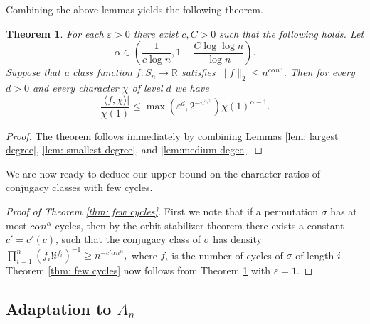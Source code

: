 \documentclass[11pt, letterpaper]{amsart}
\newtheorem{thm}{Theorem}[section]
\newcommand{\remove}[1]{}
\newcommand\eps{\varepsilon}
\renewcommand\ge{\geqslant}
\renewcommand\le{\leqslant}
\renewcommand{\epsilon}{\eps}
\begin{document}
Combining the above lemmas yields the following theorem. 
\begin{thm}\label{thm: Useful for mixing times}
For each $\epsilon>0$ there exist  $c,C>0$ such that the following holds. Let \[\alpha \in\left(\frac{1}{c\log n}, 1-\frac{C\log \log n}{\log n}\right).\] Suppose that a class function $f\colon S_n\to \mathbb{R}$ satisfies $\|f\|_2 \le  n^{c\alpha n^\alpha}.$ Then for every $d>0$ and every character $\chi$ of level $d$ we have 
\[\frac{\left|\langle f,\chi\rangle \right|}{\chi(1)} \le \max\left(\epsilon^d, 2^{-n^{3/5}}\right) \chi(1)^{\alpha -1}.\] 
\end{thm}
\begin{proof}
The theorem follows immediately by combining Lemmas \ref{lem: largest degree}, \ref{lem: smallest degree}, and \ref{lem:medium degee}.
\end{proof}

\remove{
$n^{c\alpha n^{\alpha}}\le e^{\frac{n}{\mathrm{exp}(200/\alpha)}}$

$c\beta 2^{\beta}n^{200/\beta}\le n$
}
We are now ready to deduce our upper bound on the character ratios of conjugacy classes with few cycles. 
\begin{proof}[Proof of Theorem \ref{thm: few cycles}]
First we note that if a permutation $\sigma$ has at most $c\alpha n^{\alpha}$ cycles, then by the orbit-stabilizer theorem there exists a constant $c'=c'(c)$, such that the conjugacy class of $\sigma$ has density $\prod_{i=1}^{n}(f_i!i^{f_i})^{-1}\ge n^{-c'\alpha n^{\alpha}},$ where $f_i$ is the number of cycles of $\sigma$ of length $i$.  
Theorem \ref{thm: few cycles} now follows from Theorem \ref{thm: Useful for mixing times} with $\epsilon=1$.
\end{proof}

\subsection{Adaptation to $A_n$}\label{sec:adaptation 2}
\end{document}
